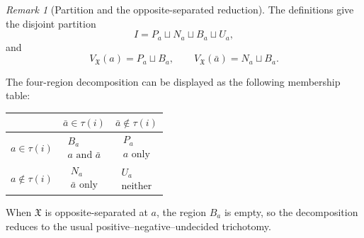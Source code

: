 \documentclass[11pt]{amsart}
\numberwithin{equation}{section}
\theoremstyle{plain}
\theoremstyle{definition}
\theoremstyle{remark}
\newtheorem{remark}[theorem]{Remark}
\begin{document}
\begin{remark}[Partition and the opposite-separated reduction]
The definitions give the disjoint partition
\[
I=P_a\sqcup N_a\sqcup B_a\sqcup U_a,
\]
and
\[
V_{\mathfrak X}(a)=P_a\sqcup B_a,
\qquad
V_{\mathfrak X}(\bar a)=N_a\sqcup B_a.
\]

The four-region decomposition can be displayed as the following membership table:
\begin{center}
\renewcommand{\arraystretch}{1.18}
\begin{tabular}{@{}c|cc@{}}
 & $\bar a\in\tau(i)$ & $\bar a\notin\tau(i)$ \\
\midrule
$a\in\tau(i)$
  & $\begin{array}{c} B_a \\[-2pt] \scriptstyle a\text{ and }\bar a \end{array}$
  & $\begin{array}{c} P_a \\[-2pt] \scriptstyle a\text{ only} \end{array}$ \\
$a\notin\tau(i)$
  & $\begin{array}{c} N_a \\[-2pt] \scriptstyle \bar a\text{ only} \end{array}$
  & $\begin{array}{c} U_a \\[-2pt] \scriptstyle \text{neither} \end{array}$ \\
\end{tabular}
\end{center}

When \(\mathfrak X\) is opposite-separated at \(a\), the region \(B_a\) is empty,
so the decomposition reduces to the usual positive--negative--undecided
trichotomy.
\end{remark}
\end{document}
